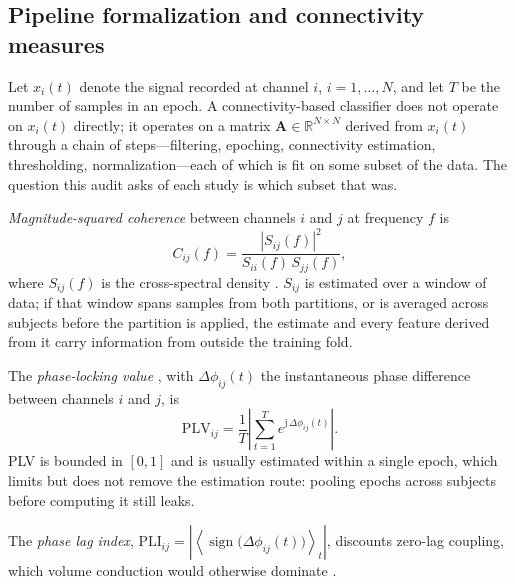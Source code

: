 
\subsection{Pipeline formalization and connectivity measures}
Let $x_i(t)$ denote the signal recorded at channel $i$, $i = 1,\dots,N$, and let $T$ be the number of samples in an epoch. A connectivity-based classifier does not operate on $x_i(t)$ directly; it operates on a matrix $\mathbf{A} \in \mathbb{R}^{N \times N}$ derived from $x_i(t)$ through a chain of steps---filtering, epoching, connectivity estimation, thresholding, normalization---each of which is fit on some subset of the data. The question this audit asks of each study is which subset that was.

\emph{Magnitude-squared coherence} between channels $i$ and $j$ at frequency $f$ is
\begin{equation}
C_{ij}(f) = \frac{|S_{ij}(f)|^2}{S_{ii}(f)\,S_{jj}(f)},
\end{equation}
where $S_{ij}(f)$ is the cross-spectral density \cite{nunez1997}. $S_{ij}$ is estimated over a window of data; if that window spans samples from both partitions, or is averaged across subjects before the partition is applied, the estimate and every feature derived from it carry information from outside the training fold.

The \emph{phase-locking value} \cite{lachaux1999}, with $\Delta\phi_{ij}(t)$ the instantaneous phase difference between channels $i$ and $j$, is
\begin{equation}
\mathrm{PLV}_{ij} = \frac{1}{T}\left|\sum_{t=1}^{T} e^{\mathrm{j}\,\Delta\phi_{ij}(t)}\right|.
\end{equation}
PLV is bounded in $[0,1]$ and is usually estimated within a single epoch, which limits but does not remove the estimation route: pooling epochs across subjects before computing it still leaks.

The \emph{phase lag index}, $\mathrm{PLI}_{ij} = \left|\left\langle \operatorname{sign}\big(\Delta\phi_{ij}(t)\big)\right\rangle_t\right|$, discounts zero-lag coupling, which volume conduction would otherwise dominate \cite{stam2007}.

